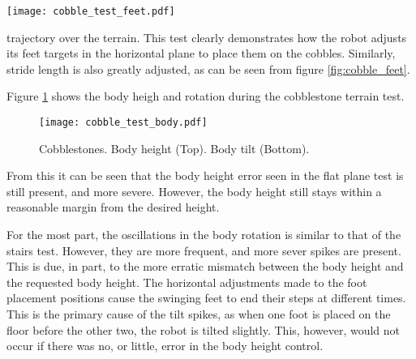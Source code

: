     \begin{centering}
        \centering
        \texttt{[image: cobble\_test\_feet.pdf]}
        \label{fig:cobble_feet}
    \end{centering}
    \noindent
    trajectory over the terrain. This test clearly demonstrates how the robot adjusts its feet targets in the horizontal plane to place them on the cobbles. Similarly, stride length is also greatly adjusted, as can be seen from figure \ref{fig:cobble_feet}.

    Figure \ref{fig:cobble_body} shows the body heigh and rotation during the cobblestone terrain test.
    \begin{figure}[h]
        \centering
        \texttt{[image: cobble\_test\_body.pdf]}
        \caption{Cobblestones. Body height (Top). Body tilt (Bottom).}
        \label{fig:cobble_body}
    \end{figure}
    From this it can be seen that the body height error seen in the flat plane test is still present, and more severe. However, the body height still stays within a reasonable margin from the desired height.

    For the most part, the oscillations in the body rotation is similar to that of the stairs test. However, they are more frequent, and more sever spikes are present. This is due, in part, to the more erratic mismatch between the body height and the requested body height. The horizontal adjustments made to the foot placement positions cause the swinging feet to end their steps at different times. This is the primary cause of the tilt spikes, as when one foot is placed on the floor before the other two, the robot is tilted slightly. This, however, would not occur if there was no, or little, error in the body height control.



